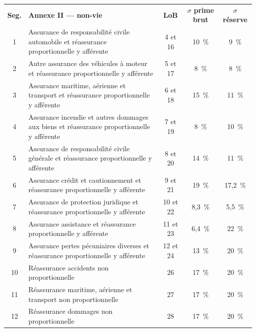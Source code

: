 \documentclass[a4paper,11pt]{article}
\begin{document}
\begin{center}
\small
{}
\begin{tabular}{@{}cp{8.0cm}ccc@{}}
\rowcolor{tableheader}
\textcolor{financeblue}{\textbf{Seg.}} &
\textcolor{financeblue}{\textbf{Annexe II --- non-vie}} &
\textcolor{financeblue}{\textbf{LoB}} &
\textcolor{financeblue}{\textbf{$\sigma$ prime brut}} &
\textcolor{financeblue}{\textbf{$\sigma$ réserve}} \\
1 & Assurance de responsabilité civile automobile et réassurance proportionnelle y afférente & 4 et 16 & 10~\% & 9~\% \\
2 & Autre assurance des véhicules à moteur et réassurance proportionnelle y afférente & 5 et 17 & 8~\% & 8~\% \\
3 & Assurance maritime, aérienne et transport et réassurance proportionnelle y afférente & 6 et 18 & 15~\% & 11~\% \\
4 & Assurance incendie et autres dommages aux biens et réassurance proportionnelle y afférente & 7 et 19 & 8~\% & 10~\% \\
5 & Assurance de responsabilité civile générale et réassurance proportionnelle y afférente & 8 et 20 & 14~\% & 11~\% \\
6 & Assurance crédit et cautionnement et réassurance proportionnelle y afférente & 9 et 21 & 19~\% & 17,2~\% \\
7 & Assurance de protection juridique et réassurance proportionnelle y afférente & 10 et 22 & 8,3~\% & 5,5~\% \\
8 & Assurance assistance et réassurance proportionnelle y afférente & 11 et 23 & 6,4~\% & 22~\% \\
9 & Assurance pertes pécuniaires diverses et réassurance proportionnelle y afférente & 12 et 24 & 13~\% & 20~\% \\
10 & Réassurance accidents non proportionnelle & 26 & 17~\% & 20~\% \\
11 & Réassurance maritime, aérienne et transport non proportionnelle & 27 & 17~\% & 20~\% \\
12 & Réassurance dommages non proportionnelle & 28 & 17~\% & 20~\% \\
\end{tabular}
\end{center}
\end{document}
